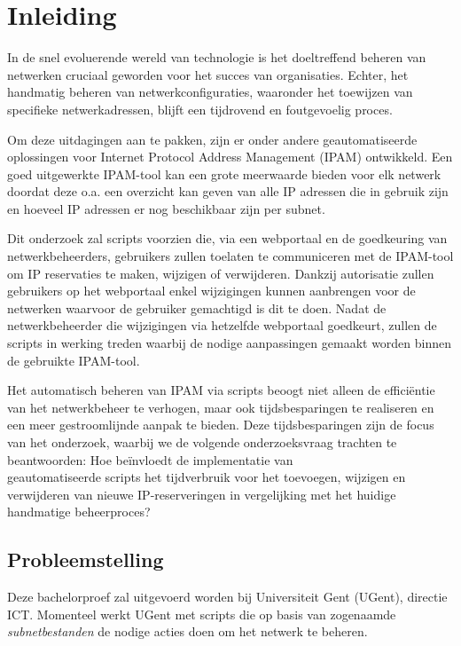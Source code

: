 \documentclass{hogent-article}
\begin{document}
\bigskip

\section{Inleiding}%
\label{sec:inleiding}
In de snel evoluerende wereld van technologie is het doeltreffend beheren van netwerken cruciaal geworden voor het succes van organisaties. Echter, het handmatig beheren van netwerkconfiguraties, waaronder het toewijzen van specifieke netwerkadressen, blijft een tijdrovend en foutgevoelig proces.

Om deze uitdagingen aan te pakken, zijn er onder andere geautomatiseerde oplossingen voor Internet Protocol Address Management (IPAM) ontwikkeld. Een goed uitgewerkte IPAM-tool kan een grote meerwaarde bieden voor elk netwerk doordat deze o.a. een overzicht kan geven van alle IP adressen die in gebruik zijn en hoeveel IP adressen er nog beschikbaar zijn per subnet.

Dit onderzoek zal scripts voorzien die, via een webportaal en de goedkeuring van netwerkbeheerders, gebruikers zullen toelaten te communiceren met de IPAM-tool om IP reservaties te maken, wijzigen of verwijderen. Dankzij autorisatie zullen gebruikers op het webportaal enkel wijzigingen kunnen aanbrengen voor de netwerken waarvoor de gebruiker gemachtigd is dit te doen. Nadat de netwerkbeheerder die wijzigingen via hetzelfde webportaal goedkeurt, zullen de scripts in werking treden waarbij de nodige aanpassingen gemaakt worden binnen de gebruikte IPAM-tool.

Het automatisch beheren van IPAM via scripts beoogt niet alleen de efficiëntie van het netwerkbeheer te verhogen, maar ook tijdsbesparingen te realiseren en een meer gestroomlijnde aanpak te bieden. Deze tijdsbesparingen zijn de focus van het onderzoek, waarbij we de volgende onderzoeksvraag trachten te beantwoorden: Hoe beïnvloedt de implementatie van \\geautomatiseerde scripts het tijdverbruik voor het toevoegen, wijzigen en verwijderen van nieuwe IP-reserveringen in vergelijking met het huidige handmatige beheerproces?

\subsection{Probleemstelling}
\label{sec:probleemstelling}
Deze bachelorproef zal uitgevoerd worden bij Universiteit Gent (UGent), directie ICT. Momenteel werkt UGent met scripts die op basis van zogenaamde \textit{subnetbestanden} de nodige acties doen om het netwerk te beheren. 
\end{document}
